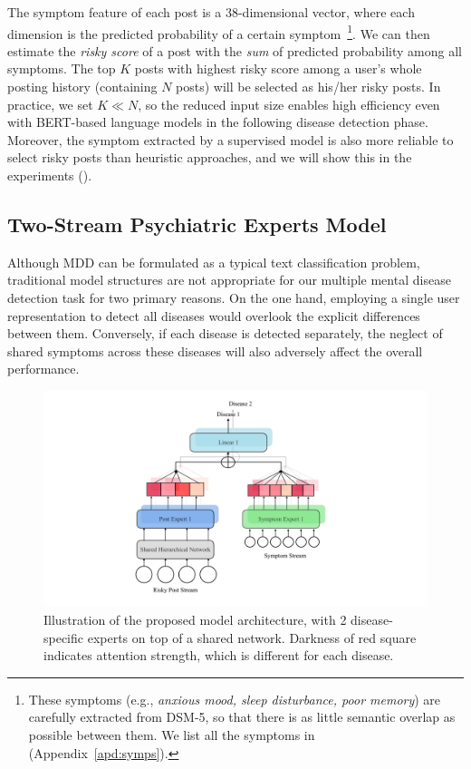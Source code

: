 The symptom feature of each post is a 38-dimensional vector, where each dimension is the predicted probability of a certain symptom~\footnote{These symptoms (e.g., \textit{anxious mood, sleep disturbance, poor memory}) are carefully extracted from DSM-5, so that there is as little semantic overlap as possible 
between them. We list all the symptoms in  (Appendix~\ref{apd:symps}).}.
We can then estimate the \textit{risky score} of a post with the \textit{sum} of predicted probability among all symptoms. The top $K$ posts with highest risky score among a user's whole posting history (containing $N$ posts) will be selected as his/her risky posts. In practice, we set $K \ll N$, so the reduced input size enables high efficiency even with BERT-based language models in the following disease detection phase. Moreover, the symptom extracted by a supervised model is also more reliable to select risky posts than heuristic approaches, and we will show this in the experiments ().

\subsection{Two-Stream Psychiatric Experts Model}
\label{sec:PsyEx_model}

Although MDD can be formulated as a typical text classification problem, traditional model structures are not appropriate for our multiple mental disease detection task for two primary reasons. On the one hand, employing a single user representation to detect all diseases would overlook the explicit differences between them. Conversely, if each disease is detected separately, the neglect of shared symptoms across these diseases will also adversely affect the overall performance.
\begin{figure}[th]
    \centering
    \includegraphics[width=0.9\columnwidth]{figures/model_arch.pdf}
    \caption{Illustration of the proposed model architecture, with 2 disease-specific experts on top of a shared network. Darkness of red
square indicates attention strength, which is different for each disease.}
    \label{fig:model_arch}
\end{figure}



